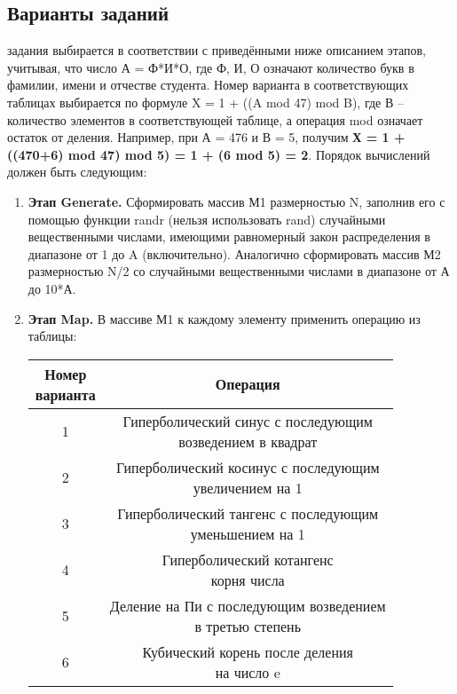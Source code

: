 { %
	\subsection{Варианты заданий}
	\Large{} задания выбирается в соответствии с приведёнными ниже описанием этапов, учитывая, что число А = Ф*И*О, где Ф, И, О означают количество букв в фамилии, имени и отчестве студента. Номер варианта в соответствующих таблицах выбирается по формуле X = 1 + ((A mod 47) mod B), где В – количество элементов в соответствующей таблице, а операция mod означает остаток от деления. Например, при А = 476 и В = 5, получим \textbf{Х = 1 + ((470+6) mod 47) mod 5) = 1 + (6 mod 5) = 2}. Порядок вычислений должен быть следующим:
	\begin{enumerate}
		\item\textbf{Этап Generate.} Сформировать массив М1 размерностью N, заполнив его с помощью функции rand\textunderscore r (нельзя использовать rand) случайными вещественными числами, имеющими равномерный закон распределения в диапазоне от 1 до A (включительно). Аналогично сформировать массив М2 размерностью N/2 со случайными вещественными числами в диапазоне от А до 10*А.
		\item\textbf{Этап Map.} В массиве М1 к каждому элементу применить операцию из таблицы:
			\begin{center}
				\begin{tabular}{|c|c|}
					\hline
					\specialcell{\textbf{Номер}\\ \textbf{варианта}} & \textbf{Операция} \\
					\hline
					1 & \specialcell{Гиперболический синус с последующим\\ возведением в квадрат} \\
					\hline
					2 & \specialcell{Гиперболический косинус с последующим\\ увеличением на 1} \\
					\hline
					3 & \specialcell{Гиперболический тангенс с последующим\\ уменьшением на 1} \\
					\hline
					4 & \specialcell{Гиперболический котангенс\\ корня числа} \\
					\hline
					5 & \specialcell{Деление на Пи с последующим возведением\\ в третью степень} \\
					\hline
					6 & \specialcell{Кубический корень после деления\\ на число e} \\

\end{tabular}
\end{center}
\end{enumerate}}
